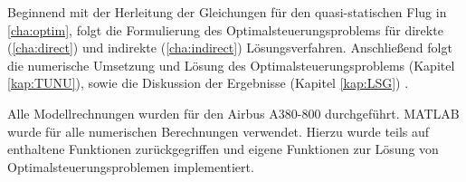 Beginnend mit der Herleitung der Gleichungen für den quasi-statischen Flug in \autoref{cha:optim}, folgt die Formulierung des Optimalsteuerungsproblems für direkte (\autoref{cha:direct}) und indirekte (\autoref{cha:indirect}) Lösungsverfahren. Anschließend folgt die numerische Umsetzung und Lösung des Optimalsteuerungsproblems (Kapitel \ref{kap:TUNU}), sowie die Diskussion der Ergebnisse (Kapitel \ref{kap:LSG}) .

Alle Modellrechnungen wurden für den Airbus A380-800 \cite{A380Tech} durchgeführt. MATLAB wurde für alle numerischen Berechnungen verwendet. Hierzu wurde teils auf enthaltene Funktionen zurückgegriffen und eigene Funktionen zur Lösung von Optimalsteuerungsproblemen implementiert.




